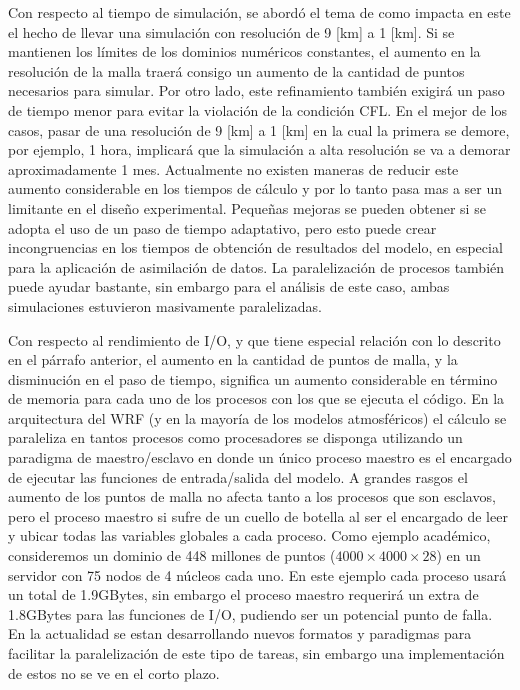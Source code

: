 Con respecto al tiempo de simulación, se abordó el tema de como impacta en este el hecho de llevar una simulación con resolución de 9 [km] a 1 [km]. Si se mantienen los límites de los dominios numéricos constantes, el aumento en la resolución de la malla traerá consigo un aumento de la cantidad de puntos necesarios para simular. Por otro lado, este refinamiento también exigirá un paso de tiempo menor para evitar la violación de la condición CFL. En el mejor de los casos, pasar de una resolución de 9 [km] a 1 [km] en la cual la primera se demore, por ejemplo, 1 hora, implicará que la simulación a alta resolución se va a demorar aproximadamente 1 mes. Actualmente no existen maneras de reducir este aumento considerable en los tiempos de cálculo y por lo tanto pasa mas a ser un limitante en el diseño experimental. Pequeñas mejoras se pueden obtener si se adopta el uso de un paso de tiempo adaptativo, pero esto puede crear incongruencias en los tiempos de obtención de resultados del modelo, en especial para la aplicación de asimilación de datos. La paralelización de procesos también puede ayudar bastante, sin embargo para el análisis de este caso, ambas simulaciones estuvieron masivamente paralelizadas.

Con respecto al rendimiento de I/O, y que tiene especial relación con lo descrito en el párrafo anterior, el aumento en la cantidad de puntos de malla, y la disminución en el paso de tiempo, significa un aumento considerable en término de memoria para cada uno de los procesos con los que se ejecuta el código. En la arquitectura del WRF (y en la mayoría de los modelos atmosféricos) el cálculo se paraleliza en tantos procesos como procesadores se disponga utilizando un paradigma de maestro/esclavo en donde un único proceso maestro es el encargado de ejecutar las funciones de entrada/salida del modelo. A grandes rasgos el aumento de los puntos de malla no afecta tanto a los procesos que son esclavos, pero el proceso maestro si sufre de un cuello de botella al ser el encargado de leer y ubicar todas las variables globales a cada proceso. Como ejemplo académico, consideremos un dominio de 448 millones de puntos ($4000\times4000\times28$) en un servidor con 75 nodos de 4 núcleos cada uno. En este ejemplo cada proceso usará un total de 1.9GBytes, sin embargo el proceso maestro requerirá un extra de 1.8GBytes para las funciones de I/O, pudiendo ser un potencial punto de falla. En la actualidad se estan desarrollando nuevos formatos y paradigmas para facilitar la paralelización de este tipo de tareas, sin embargo una implementación de estos no se ve en el corto plazo.

